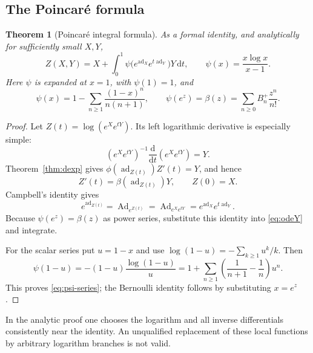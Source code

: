 \documentclass[11pt]{article}
\newtheorem{theorem}{Theorem}[section]
\theoremstyle{definition}
\theoremstyle{remark}
\newcommand{\dd}{\mathrm d}
\newcommand{\ad}{\operatorname{ad}}
\newcommand{\Ad}{\operatorname{Ad}}
\numberwithin{equation}{section}
\begin{document}
\subsection{The Poincar\'e formula}
\begin{theorem}[Poincar\'e integral formula]\label{thm:poincare}
As a formal identity, and analytically for sufficiently small $X,Y$,
\begin{equation}\label{eq:poincare}
 \boxed{
 Z(X,Y)=X+\int_0^1
       \psi\bigl(e^{\ad_X}e^{t\ad_Y}\bigr)Y\,\dd t,\qquad
 \psi(x)=\frac{x\log x}{x-1}.}
\end{equation}
Here $\psi$ is expanded at $x=1$, with $\psi(1)=1$, and
\begin{equation}\label{eq:psi-series}
 \psi(x)=1-\sum_{n\geq1}\frac{(1-x)^n}{n(n+1)},
 \qquad
 \psi(e^z)=\beta(z)=\sum_{n\geq0}B_n^+\frac{z^n}{n!}.
\end{equation}
\end{theorem}
\begin{proof}
Let $Z(t)=\log(e^Xe^{tY})$. Its left logarithmic derivative is especially simple:
\[
 (e^Xe^{tY})^{-1}\frac{\dd}{\dd t}(e^Xe^{tY})=Y.
\]
Theorem~\ref{thm:dexp} gives $\phi(\ad_{Z(t)})Z'(t)=Y$, and hence
\begin{equation}\label{eq:odeY}
 Z'(t)=\beta(\ad_{Z(t)})Y,\qquad Z(0)=X.
\end{equation}
Campbell's identity gives
\[
 e^{\ad_{Z(t)}}=\Ad_{e^{Z(t)}}
 =\Ad_{e^Xe^{tY}}=e^{\ad_X}e^{t\ad_Y}.
\]
Because $\psi(e^z)=\beta(z)$ as power series, substitute this identity into \eqref{eq:odeY} and integrate.

For the scalar series put $u=1-x$ and use $\log(1-u)=-\sum_{k\geq1}u^k/k$. Then
\[
 \psi(1-u)=-(1-u)\frac{\log(1-u)}u
 =1+\sum_{n\geq1}\left(\frac1{n+1}-\frac1n\right)u^n.
\]
This proves \eqref{eq:psi-series}; the Bernoulli identity follows by substituting $x=e^z$.
\end{proof}
In the analytic proof one chooses the logarithm and all inverse differentials consistently near the identity. An unqualified replacement of these local functions by arbitrary logarithm branches is not valid.
\end{document}
